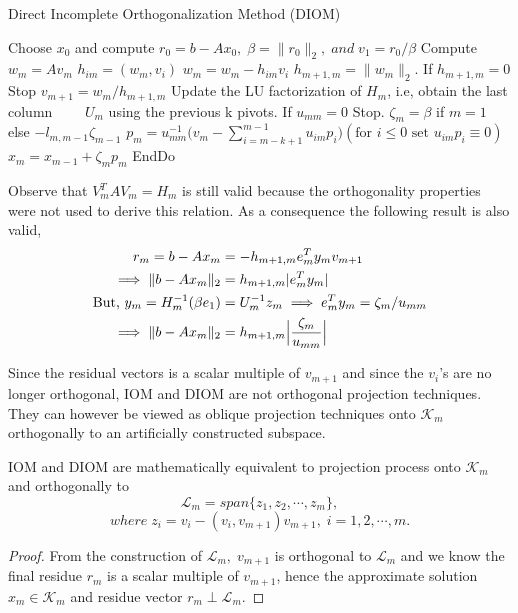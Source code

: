 \documentclass[10pt,a4paper]{article}
\begin{document}
\begin{algorithm}
\caption{Direct Incomplete Orthogonalization Method (DIOM)}
\begin{algorithmic}[1]
\State Choose $x_0$ and compute $r_0=b-Ax_0,\;\beta=\|r_0\|_2,\;and\;v_1=r_0/\beta$
	\State Compute $w_m = Av_m$
		\State $h_{im} = (w_m,v_i)$
		\State $w_m = w_m - h_{im}v_i$
	\EndFor
	\State $h_{m+1,m} = \|w_m\|_2$. If $h_{m+1,m}=0$ Stop
	\State $v_{m+1}=w_m/h_{m+1,m}$
	\State Update the LU factorization of $H_m$, i.e, obtain the last column 	
	\State $\qquad U_m$ using the previous k pivots. If $u_{mm}=0$ Stop.
	\State $\zeta_m = \beta$ if $m=1$ else $-l_{m,m-1}\zeta_{m-1}$
	\State $p_m = u^{-1}_{mm}\Big( v_m-\sum^{m-1}_{i=m-k+1}u_{im}p_i \Big)(\text{for }i\le0\text{ set }u_{im}p_i\equiv0)$
	\State $x_m=x_{m-1}+\zeta_mp_m$
\EndFor
\State EndDo
\end{algorithmic}
\end{algorithm}

\begin{remark}
Observe that $V^T_mAV_m=H_m$ is still valid because the orthogonality properties were not used to derive this relation. As a consequence the following result  is also valid,
\begin{align*}
r_m = b-Ax_m &= -h_{m+1,m}e^T_my_mv_{m+1} \\
\implies \|b-Ax_m\|_2 &= h_{m+1,m}|e^T_my_m| \\
\text{But, }y_m = H^{-1}_m(\beta	e_1) &= U^{-1}_mz_m \implies e^T_my_m = \zeta_m/u_{mm} \\
\implies \|b-Ax_m\|_2 &= h_{m+1,m}\Bigl|\frac{\zeta_m}{u_{mm}}\Bigr|
\end{align*}
\end{remark}

Since the residual vectors is a scalar multiple of $v_{m+1}$ and since the $v_i$'s are no longer orthogonal, IOM and DIOM are not orthogonal projection techniques. They can however be viewed as oblique projection techniques onto $\mathcal{K}_m$ orthogonally to an artificially constructed subspace.

\begin{prop}
IOM and DIOM are mathematically equivalent to projection process onto $\mathcal{K}_m$ and orthogonally to
$$\mathcal{L}_m=span\{z_1,z_2,\cdots,z_m\},$$
$$where\;z_i=v_i-(v_i,v_{m+1})v_{m+1},\;i=1,2,\cdots,m.$$
\end{prop}

\begin{proof}
From the construction of $\mathcal{L}_m,\;v_{m+1}$ is orthogonal to $\mathcal{L}_m$ and we know the final residue $r_m$ is a scalar multiple of $v_{m+1}$, hence the approximate solution $x_m\in\mathcal{K}_m$ and residue vector $r_m\perp\mathcal{L}_m$.  
\end{proof}
\end{document}
